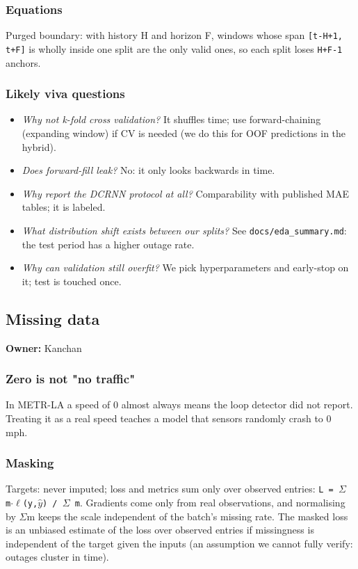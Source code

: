 \documentclass[10pt,a4paper]{article}
\begin{document}
\subsubsection*{Equations}
Purged boundary: with history H and horizon F, windows whose span \texttt{[t-H+1, t+F]} is wholly inside one split are the only valid ones, so each split loses \texttt{H+F-1} anchors.

\subsubsection*{Likely viva questions}
\begin{itemize}[nosep,leftmargin=*]
\item \emph{Why not k-fold cross validation?} It shuffles time; use forward-chaining (expanding window) if CV is needed (we do this for OOF predictions in the hybrid).
\item \emph{Does forward-fill leak?} No: it only looks backwards in time.
\item \emph{Why report the DCRNN protocol at all?} Comparability with published MAE tables; it is labeled.
\item \emph{What distribution shift exists between our splits?} See \texttt{docs/\allowbreak{}eda\_\allowbreak{}summary.md}: the test period has a higher outage rate.
\item \emph{Why can validation still overfit?} We pick hyperparameters and early-stop on it; test is touched once.
\end{itemize}

\subsection*{Missing data}
\textbf{Owner:} Kanchan

\subsubsection*{Zero is not "no traffic"}
In METR-LA a speed of 0 almost always means the loop detector did not report. Treating it as a real speed teaches a model that sensors randomly crash to 0 mph.

\subsubsection*{Masking}
Targets: never imputed; loss and metrics sum only over observed entries: \texttt{L = \ensuremath{\Sigma} m\ensuremath{\cdot}\ensuremath{\ell}(y,\ensuremath{\hat{y}}) /\allowbreak{} \ensuremath{\Sigma} m}. Gradients come only from real observations, and normalising by \ensuremath{\Sigma}m keeps the scale independent of the batch's missing rate. The masked loss is an unbiased estimate of the loss over observed entries if missingness is independent of the target given the inputs (an assumption we cannot fully verify: outages cluster in time).
\end{document}
